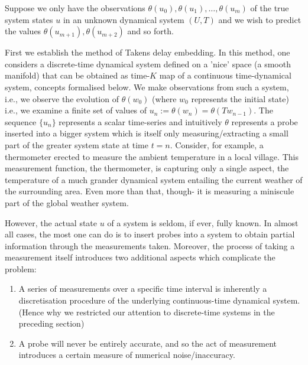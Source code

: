 \documentclass[a4paper,12pt,twoside]{report}
\begin{document}
Suppose we only have the observations $\theta(u_0), \theta(u_1), \ldots, \theta(u_m)$ of the true system states $u$ in an unknown dynamical system $(U,T)$ and we wish to predict the values $\theta(u_{m+1}), \theta(u_{m+2})$ and so forth.

First we establish the method of Takens delay embedding. 
In this method, one considers a discrete-time dynamical system defined on a 'nice' space (a smooth manifold) that can be obtained as time-$K$ map of a continuous time-dynamical system, concepts formalised below.
We make observations from such a system, i.e., we observe the evolution of $\theta(w_0)$ (where $w_0$ represents the initial state) i.e., we examine  a finite set of values of $u_n :=  \theta(w_n) = \theta(Tw_{n-1})$. The sequence $\{u_n\}$ represents a scalar time-series and intuitively $\theta$ represents a probe inserted into a bigger system which is itself only measuring/extracting a small part of the greater system state at time $t=n$. 
Consider, for example, a thermometer erected to measure the ambient temperature in a local village. This measurement function, the thermometer, is capturing only a single aspect, the temperature of a much grander dynamical system entailing the current weather of the surrounding area. Even more than that, though- it is measuring a miniscule part of the global weather system.



However, the actual state $u$ of a system is seldom, if ever, fully known. In almost all cases, the most one can do is to insert probes into a system to obtain partial information through the measurements taken. Moreover, the process of taking a measurement itself introduces two additional aspects which complicate the problem: 
\vspace{-8mm}
\begin{enumerate}[noitemsep, label=\roman*.]
  \item A series of measurements over a specific time interval is inherently a discretisation procedure of the underlying continuous-time dynamical system. (Hence why we restricted our attention to discrete-time systems in the preceding section)
  \item A probe will never be entirely accurate, and so the act of measurement introduces a certain measure of numerical noise/inaccuracy.
\end{enumerate}
\end{document}
